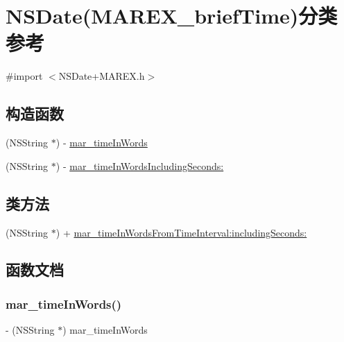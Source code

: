 \hypertarget{category_n_s_date_07_m_a_r_e_x__brief_time_08}{}\section{N\+S\+Date(M\+A\+R\+E\+X\+\_\+brief\+Time)分类 参考}
\label{category_n_s_date_07_m_a_r_e_x__brief_time_08}


{\ttfamily \#import $<$N\+S\+Date+\+M\+A\+R\+E\+X.\+h$>$}

\subsection*{构造函数}
\begin{DoxyCompactItemize}
\item 
(N\+S\+String $\ast$) -\/ \hyperlink{category_n_s_date_07_m_a_r_e_x__brief_time_08_a036722e23a4872ddf45b2fa7ade0fa73}{mar\+\_\+time\+In\+Words}
\item 
(N\+S\+String $\ast$) -\/ \hyperlink{category_n_s_date_07_m_a_r_e_x__brief_time_08_ab0e5ee3344f27424852f5aaa360e099c}{mar\+\_\+time\+In\+Words\+Including\+Seconds\+:}
\end{DoxyCompactItemize}
\subsection*{类方法}
\begin{DoxyCompactItemize}
\item 
(N\+S\+String $\ast$) + \hyperlink{category_n_s_date_07_m_a_r_e_x__brief_time_08_a88fc6aa79deb4cb45bd563759c109c80}{mar\+\_\+time\+In\+Words\+From\+Time\+Interval\+:including\+Seconds\+:}
\end{DoxyCompactItemize}


\subsection{函数文档}
\mbox{\label{category_n_s_date_07_m_a_r_e_x__brief_time_08_a036722e23a4872ddf45b2fa7ade0fa73}} 
\subsubsection{\texorpdfstring{mar\+\_\+time\+In\+Words()}{mar\_timeInWords()}}
{\footnotesize\ttfamily -\/ (N\+S\+String $\ast$) mar\+\_\+time\+In\+Words \begin{DoxyParamCaption}{ }\end{DoxyParamCaption}}


